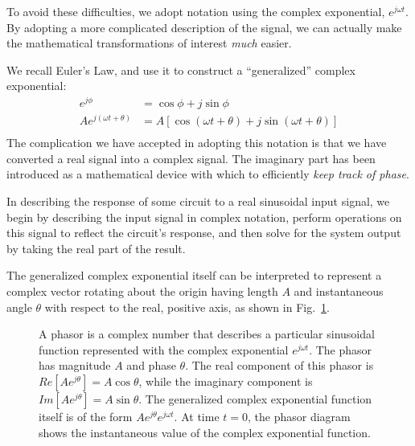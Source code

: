 To avoid these difficulties, we adopt notation using the complex exponential,
$e^{j\omega t}$. By adopting a more complicated description of the
signal, we can actually make the mathematical transformations of
interest \textit{much} easier.

We recall Euler's Law, and use it to construct a ``generalized''
complex exponential:
\begin{equation}
\begin{split}
e^{j\phi} &= \cos\phi + j\sin\phi\\
Ae^{j(\omega t + \theta)} &=A[\cos(\omega t + \theta) + j\sin(\omega t + \theta)]\\
\end{split}
\end{equation}
The complication we have accepted in adopting this notation is that we
have converted a real signal into a complex signal. The imaginary part
has been introduced as a mathematical device with which to efficiently 
\textit{keep track of phase}. 

In describing the response of some circuit to a real sinusoidal input
signal, we begin by describing the input signal in complex notation,
perform operations on this signal to reflect the circuit's response, and
then solve for the system output by taking the real part of the
result.

The generalized complex exponential itself can be interpreted to
represent a complex vector rotating about the origin having length $A$
and instantaneous angle $\theta$ with respect to the real, positive
axis, as shown in Fig.~\ref{fig:phasor}.
\begin{figure}[h]
\centering
\epsfxsize=2.0in
\caption{A phasor is a complex number that describes a particular
sinusoidal function represented with the complex exponential
$e^{j\omega t}$.  The phasor has magnitude $A$ and phase $\theta$. The
real component of this phasor is $Re[Ae^{j\theta}] = A \cos\theta$,
while the imaginary component is $Im[Ae^{j\theta}] = A \sin\theta$.
The generalized complex exponential function itself is of the form
$Ae^{j\theta}e^{j\omega t}$. At time $t=0$, the phasor diagram shows
the instantaneous value of the complex exponential function.}
\label{fig:phasor}
\end{figure}

